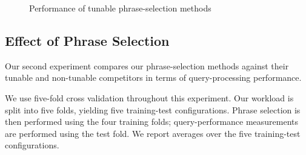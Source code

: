 \begin{figure}[!ht]
    \centering  
    \quad
    
    \caption{Performance of tunable phrase-selection methods}
    
    \label{fig:tunable}
\end{figure}

\subsection{Effect of Phrase Selection}

Our second experiment compares our phrase-selection methods against
their tunable and non-tunable competitors in terms of query-processing
performance.

We use five-fold cross validation throughout this experiment. Our
workload is split into five folds, yielding five training-test
configurations. Phrase selection is then performed using the four
training folds; query-performance measurements are performed using the
test fold. We report averages over the five training-test
configurations.

